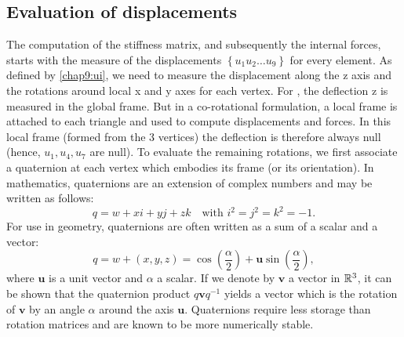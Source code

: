 	\subsection{Evaluation of displacements}
The computation of the stiffness matrix, and subsequently the internal forces, starts with the measure of the displacements $\left\{u_1 u_2 \ldots u_9 \right\} $ for every element. As defined by \eqref{chap9:ui}, we need to measure the displacement along the z axis and the rotations around local x and y axes for each vertex. For \cite{Przemieniecki85}, the deflection z is measured in the global frame. But in a co-rotational formulation, a local frame is attached to each triangle and used to compute displacements and forces. In this local frame (formed from the 3 vertices) the deflection is therefore always null (hence, $ u_1, u_4, u_7 $ are null). To evaluate the remaining rotations, we first associate a quaternion at each vertex which embodies its frame (or its orientation). In mathematics, quaternions are an extension of complex numbers and may be written as follows:
\begin{equation}
q = w + x i + y j + z k \quad \mbox{with } i^2 = j^2 = k^2 = -1.
\end{equation}
For use in geometry, quaternions are often written as a sum of a scalar and a vector:
\begin{equation}
q = w + (x, y, z) = \cos (\frac{\alpha}{2}) + \mathbf{u} \sin (\frac{\alpha}{2}),
\end{equation}
where $ \mathbf{u} $ is a unit vector and $ \alpha $ a scalar. If we denote by $ \mathbf{v} $ a vector in $\mathbb{R}^3$, it can be shown that the quaternion product $ q \mathbf{v} q^{-1} $ yields a vector which is the rotation of $ \mathbf{v} $ by an angle $ \alpha $ around the axis $ \mathbf{u} $. Quaternions require less storage than rotation matrices and are known to be more numerically stable. 


